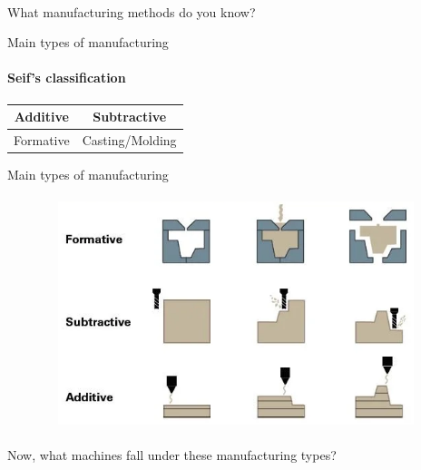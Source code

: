 \documentclass[aspectratio=169]{beamer}
\begin{document}
\begin{frame}[c]{}
    \framesubtitle{}
        \LARGE \centering
        What manufacturing methods do you know? 
    \end{frame}

    \begin{frame}[c]{Main types of manufacturing}
        \framesubtitle{Seif's classification}
        \begin{table}[H]
            \LARGE
            \centering
            \begin{tabular}{|c|c|}
            \hline
            Additive & Subtractive  \\ \hline
            Formative & Casting/Molding \\ \hline
            \end{tabular}
        \end{table}
        \end{frame}

\begin{frame}[t]{Main types of manufacturing}
\framesubtitle{}
    \vspace{-0.6cm}
    \begin{figure}[H]
        \centering\includegraphics[height=6.5cm,width=1\textwidth,keepaspectratio]{fig1.png}
        \label{fig:fig1.png}
    \end{figure}
\end{frame}

\begin{frame}[c]{}
    \framesubtitle{}
        \LARGE \centering
        Now, what machines fall under these manufacturing types? 
    \end{frame}
\end{document}
